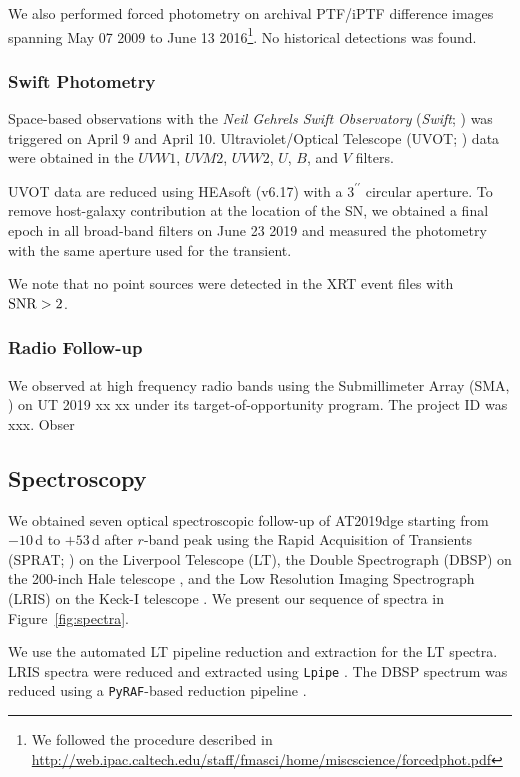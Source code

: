 \documentclass[twocolumn]{aastex63}
\begin{document}
\begin{CJK*}{UTF8}{gbsn}
We also performed forced photometry on archival PTF/iPTF difference images spanning May 07 2009 to 
June 13 2016\footnote{We followed the procedure described in 
	\url{http://web.ipac.caltech.edu/staff/fmasci/home/miscscience/forcedphot.pdf}}. No historical 
detections was found. 

\subsubsection{Swift Photometry}
 
Space-based observations with the \textit{Neil Gehrels Swift Observatory} (\textit{Swift}; 
\citealt{Gehrels2004}) was triggered on April 9 and April 10. Ultraviolet/Optical Telescope (UVOT; 
\citealt{Roming2005}) data were obtained in the $UVW1$, $UVM2$, $UVW2$, $U$, $B$, and $V$ 
filters. 

UVOT data are reduced using HEAsoft (v6.17) with a $3^{\prime\prime}$ circular aperture. To remove 
host-galaxy contribution at the location of 
the SN, we obtained a final epoch in all broad-band filters on June 23 2019 and measured the 
photometry with the same aperture used for the transient. 

We note that no point sources were detected in the XRT event files with $\rm{SNR}>2$.

\subsubsection{Radio Follow-up}
We observed at high frequency radio bands using the Submillimeter Array (SMA, \citealt{Ho2004}) on 
UT 2019 xx xx under its target-of-opportunity program. The project ID was xxx. Obser


\subsection{Spectroscopy}

We obtained seven optical spectroscopic follow-up of AT2019dge  starting from $-10$\,d to $+53$\,d 
after $r$-band peak using the Rapid Acquisition of Transients (SPRAT; \citealt{Piascik2014}) on the 
Liverpool Telescope (LT), the Double Spectrograph (DBSP) on the 200-inch Hale telescope 
\citep{Oke1982}, and the Low Resolution Imaging Spectrograph (LRIS) on the Keck-I telescope 
\citep{Oke1995}. We present our sequence of spectra in Figure~\ref{fig:spectra}. 

We use the automated LT pipeline reduction and extraction for the LT spectra. LRIS spectra were 
reduced and extracted using \texttt{Lpipe} \citep{Perley2019lpipe}. The DBSP spectrum was reduced 
using a \texttt{PyRAF}-based reduction pipeline \citep{Bellm2016}.


\end{CJK*}
\end{document}
